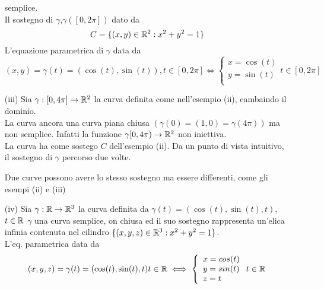 \begin{example}
\begin{itemize}
                semplice. \\
                Il sostegno di $\gamma$,$\gamma([0,2\pi])$ \ace dato da 
                $$C = \{(x,y)\in\mathbb{R}^2 : x^2+y^2 = 1\}$$
                L'equazione parametrica di $\gamma$ \ace data da 
                $$(x,y) = \gamma(t) = (\cos(t), \sin(t)), t \in [0,2\pi] \iff \left\{\begin{array}{l}
                  x = \cos(t) \\
                  y = \sin(t) \\
                \end{array}\right.t \in [0,2\pi]$$
    \item[(iii)] Sia $\gamma : [0,4\pi] \to \mathbb{R}^2$ la curva definita come nell'esempio (ii), cambaindo il dominio.\\
                  La curva \ace ancora una curva piana chiusa $(\gamma(0) = (1,0) = \gamma(4\pi))$ ma non \ace semplice.
                  Infatti la funzione $\gamma [0,4\pi) \to \mathbb{R}^2$ non \ace iniettiva.\\
                  La curva ha come sostego $C$ dell'esempio (ii). Da un punto di vista intuitivo, il sostegno di $\gamma$
                  \ace percorso due volte.
                  \begin{NB}
                    Due curve possono avere lo stesso sostegno ma essere differenti, come gli esempi (ii) e (iii)
                  \end{NB}
    \item[(iv)] Sia $\gamma:\mathbb{R} \to \mathbb{R}^3$ la curva definita da $\gamma(t) = (\cos(t),\sin(t),t)$, $t\in\mathbb{R}$
                  $\gamma$ \ace una curva semplice, on chiusa ed il suo sostegno rappresenta un'elica infinia
                  contenuta nel cilindro $\{(x,y,z)\in\mathbb{R}^3:x^2+y^2=1\}$. \\
                  L'eq. parametrica \ace data da 
                  $$(x,y,z) = \gamma(t) = (\cos(t),\sin(t),t) t \in \mathbb{R} \iff \left\{\begin{array}{l}
                    x = cos(t) \\
                    y = sin(t) \\
                    z = t \\
                  \end{array}\right. t \in \mathbb{R}$$
  \end{itemize}
\end{example}
